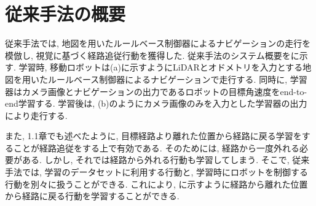 
\section{従来手法の概要}
従来手法\cite{okada-si2020}では, 地図を用いたルールベース制御器によるナビゲーションの走行を模倣し, 視覚に基づく経路追従行動を獲得した. 従来手法のシステム概要をに示す. 学習時, 移動ロボットは(a)に示すようにLiDARとオドメトリを入力とする地図を用いたルールベース制御器によるナビゲーションで走行する. 同時に, 学習器はカメラ画像とナビゲーションの出力であるロボットの目標角速度をend-to-end学習する. 学習後は, (b)のようにカメラ画像のみを入力とした学習器の出力により走行する. \par また, 1.1章でも述べたように, 目標経路より離れた位置から経路に戻る学習をすることが経路追従をする上で有効である. そのためには, 経路から一度外れる必要がある. しかし, それでは経路から外れる行動も学習してしまう. そこで, 従来手法では, 学習のデータセットに利用する行動と, 学習時にロボットを制御する行動を別々に扱うことができる. これにより, に示すように経路から離れた位置から経路に戻る行動を学習することができる. 

